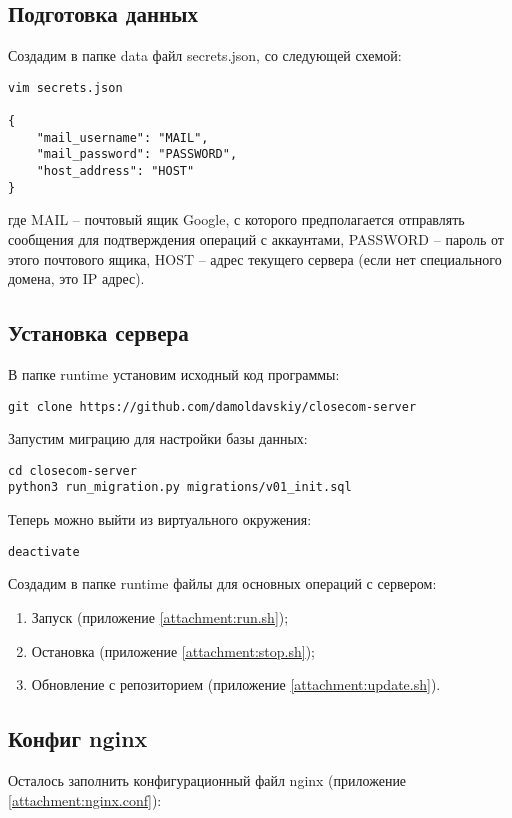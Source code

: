 \documentclass[progmanual]{espd}
\begin{document}
\subsection{Подготовка данных}
Создадим в папке data файл secrets.json, со следующей схемой:

\begin{verbatim}
vim secrets.json

{
    "mail_username": "MAIL",
    "mail_password": "PASSWORD",
    "host_address": "HOST"
}
\end{verbatim}

где MAIL -- почтовый ящик Google, с которого предполагается отправлять сообщения для подтверждения операций с аккаунтами, PASSWORD -- пароль от этого почтового ящика, HOST -- адрес текущего сервера (если нет специального домена, это IP адрес).

\subsection{Установка сервера}
В папке runtime установим исходный код программы:

\begin{verbatim}
git clone https://github.com/damoldavskiy/closecom-server
\end{verbatim}

Запустим миграцию для настройки базы данных:

\begin{verbatim}
cd closecom-server
python3 run_migration.py migrations/v01_init.sql
\end{verbatim}

Теперь можно выйти из виртуального окружения:

\begin{verbatim}
deactivate
\end{verbatim}

Создадим в папке runtime файлы для основных операций с сервером:

\begin{enumerate}
\item Запуск (приложение \ref{attachment:run.sh});
\item Остановка (приложение \ref{attachment:stop.sh});
\item Обновление с репозиторием (приложение \ref{attachment:update.sh}).
\end{enumerate}

\subsection{Конфиг nginx}
Осталось заполнить конфигурационный файл nginx (приложение \ref{attachment:nginx.conf}):
\end{document}
